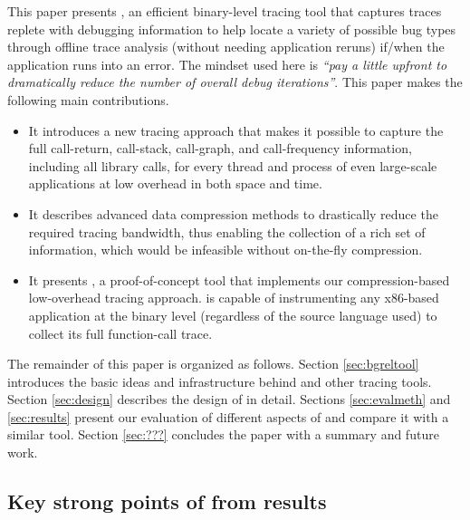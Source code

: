 This paper presents \parlot, an efficient binary-level tracing tool that captures traces replete with debugging information to help locate a variety of possible bug types through offline trace analysis (without needing application reruns) if/when the application runs into an error. The mindset used here is \textit{``pay a little upfront to dramatically reduce the number of overall debug iterations''}. This paper makes the following main contributions.
\begin{itemize}
\item It introduces a new tracing approach that makes it possible to capture the full call-return, call-stack, call-graph, and call-frequency information, including all library calls, for every thread and process of even large-scale applications at low overhead in both space and time.
\item It describes advanced data compression methods to drastically reduce the required tracing bandwidth, thus enabling the collection of a rich set of information, which would be infeasible without on-the-fly compression.
\item It presents \parlot, a proof-of-concept tool that implements our compression-based low-overhead tracing approach. \parlot is capable of instrumenting any x86-based application at the binary level (regardless of the source language used) to collect its full function-call trace.
\end{itemize}
The remainder of this paper is organized as follows. Section \ref{sec:bgreltool} introduces the basic ideas and infrastructure behind \parlot and other tracing tools. Section \ref{sec:design} describes the design of \parlot in detail. Sections \ref{sec:evalmeth} and \ref{sec:results} present our evaluation of different aspects of \parlot and compare it with a similar tool. Section \ref{sec:???} concludes the paper with a summary and future work.


\subsection{Key strong points of \parlot from results}

